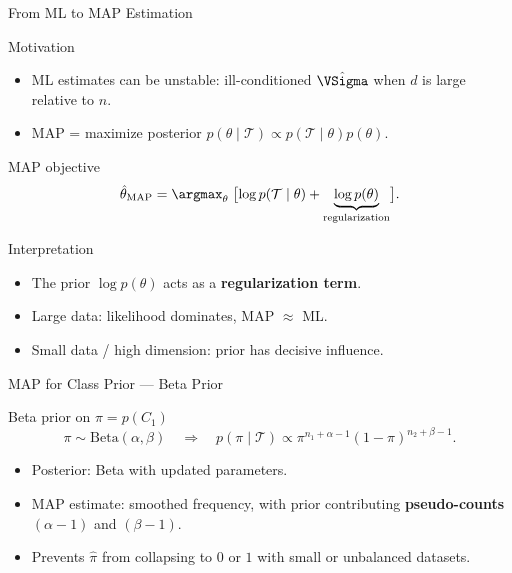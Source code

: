 \begin{frame}{From ML to MAP Estimation}
  \begin{block}{Motivation}
    \begin{itemize}
      \item ML estimates can be unstable: ill-conditioned $\hat\VSigma$ when $d$ is large relative to $n$.
      \item MAP = maximize posterior $p(\theta\mid\mathcal{T})\propto p(\mathcal{T}\mid\theta)p(\theta)$.
    \end{itemize}
  \end{block}

  \begin{block}{MAP objective}
    \[
      \hat\theta_{\mathrm{MAP}}=\argmax_\theta\;\bigl[\log p(\mathcal{T}\mid\theta)+\underbrace{\log p(\theta)}_{\text{regularization}}\bigr].
    \]
  \end{block}

  \begin{alertblock}{Interpretation}
    \begin{itemize}
      \item The prior $\log p(\theta)$ acts as a \textbf{regularization term}.
      \item Large data: likelihood dominates, MAP $\approx$ ML.
      \item Small data / high dimension: prior has decisive influence.
    \end{itemize}
  \end{alertblock}
\end{frame}

\begin{frame}{MAP for Class Prior — Beta Prior}
  \begin{block}{Beta prior on $\pi=p(C_1)$}
    \[
      \pi\sim\mathrm{Beta}(\alpha,\beta)\quad\Rightarrow\quad
      p(\pi\mid\mathcal{T})\propto\pi^{n_1+\alpha-1}(1-\pi)^{n_2+\beta-1}.
    \]
    \begin{itemize}
      \item Posterior: Beta with updated parameters.
      \item MAP estimate: smoothed frequency, with prior contributing \textbf{pseudo-counts}
            $(\alpha-1)$ and $(\beta-1)$.
      \item Prevents $\hat\pi$ from collapsing to $0$ or $1$ with small or unbalanced datasets.
    \end{itemize}
  \end{block}
\end{frame}

